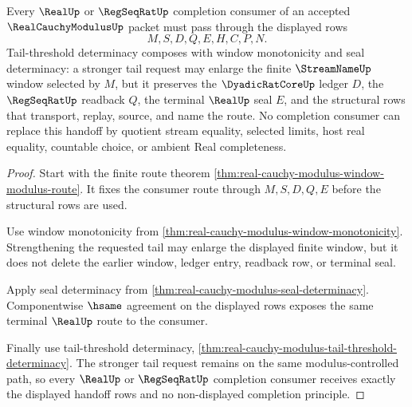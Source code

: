 \begin{theorem}
\label{thm:real-cauchy-modulus-tail-handoff}
Every $\RealUp$ or $\RegSeqRatUp$ completion consumer of an accepted $\RealCauchyModulusUp$ packet must pass through the displayed rows
$$
M,S,D,Q,E,H,C,P,N.
$$
Tail-threshold determinacy composes with window monotonicity and seal determinacy: a stronger tail request may enlarge the finite $\StreamNameUp$ window selected by $M$, but it preserves the $\DyadicRatCoreUp$ ledger $D$, the $\RegSeqRatUp$ readback $Q$, the terminal $\RealUp$ seal $E$, and the structural rows that transport, replay, source, and name the route. No completion consumer can replace this handoff by quotient stream equality, selected limits, host real equality, countable choice, or ambient Real completeness.
\end{theorem}
\begin{proof}
Start with the finite route theorem \autoref{thm:real-cauchy-modulus-window-modulus-route}. It fixes the consumer route through $M,S,D,Q,E$ before the structural rows are used.

Use window monotonicity from \autoref{thm:real-cauchy-modulus-window-monotonicity}. Strengthening the requested tail may enlarge the displayed finite window, but it does not delete the earlier window, ledger entry, readback row, or terminal seal.

Apply seal determinacy from \autoref{thm:real-cauchy-modulus-seal-determinacy}. Componentwise $\hsame$ agreement on the displayed rows exposes the same terminal $\RealUp$ route to the consumer.

Finally use tail-threshold determinacy, \autoref{thm:real-cauchy-modulus-tail-threshold-determinacy}. The stronger tail request remains on the same modulus-controlled path, so every $\RealUp$ or $\RegSeqRatUp$ completion consumer receives exactly the displayed handoff rows and no non-displayed completion principle.
\end{proof}

